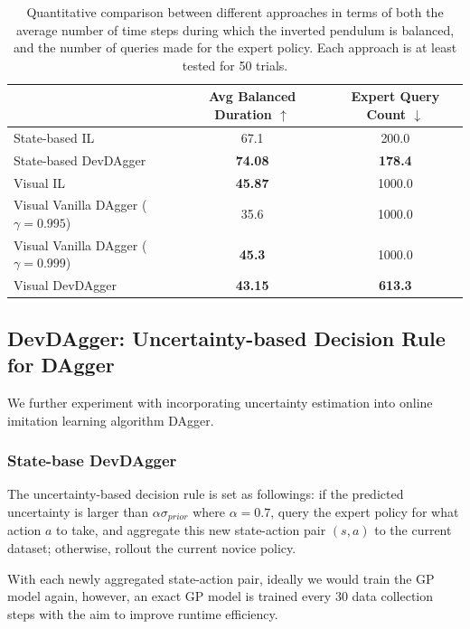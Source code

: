 \documentclass[11pt, reqno, letterpaper, twoside]{amsart}
\begin{document}
\begin{table}[ht]
	\centering
	\begin{tabular}{|l|c|c|}
		\hline
		                                         & Avg Balanced Duration $\uparrow$
		                                         & Expert Query Count $\downarrow$
		\\
		\hline
		State-based IL                           & 67.1                             & 200.0
		\\
		\hline
		State-based DevDAgger                    & \textbf{74.08}                   & \textbf{178.4}
		\\
		\hhline{|=|=|=|}
		Visual IL                                & \textbf{45.87}                   & 1000.0
		\\
		\hline
		Visual Vanilla DAgger ($\gamma = 0.995$) & 35.6                             & 1000.0
		\\
		\hline
		Visual Vanilla DAgger ($\gamma = 0.999$) & \textbf{45.3}                    & 1000.0
		\\
		\hline
		Visual DevDAgger                         & \textbf{43.15}                   & \textbf{613.3}
		\\
		\hline
	\end{tabular}
	\caption{Quantitative comparison between different approaches in terms of both the average number of time steps during which the inverted pendulum is balanced, and the number of queries made for the expert policy. Each approach is at least tested for 50 trials.}
	\label{tab:comparison}
\end{table}

\subsection{DevDAgger: Uncertainty-based Decision Rule for DAgger}
We further experiment with incorporating uncertainty estimation into online
imitation learning algorithm DAgger.

\subsubsection{State-base DevDAgger}
The uncertainty-based decision rule is set as followings: if the predicted
uncertainty is larger than $\alpha \sigma_{prior}$ where $\alpha=0.7$, query the
expert policy for what action $a$ to take, and aggregate this new state-action
pair $(s, a)$ to the current dataset; otherwise, rollout the current novice
policy.

With each newly aggregated state-action pair, ideally we would train the GP
model again, however, an exact GP model is trained every $30$ data collection
steps with the aim to improve runtime efficiency.
\end{document}
